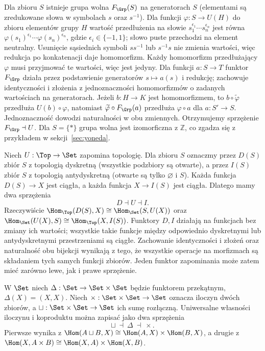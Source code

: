 \begin{przyklad}
Dla zbioru $S$ istnieje grupa wolna $F_{\Grp}(S)$ na generatorach $S$ (elementami są zredukowane słowa w symbolach $s$ oraz $s^{-1}$). Dla funkcji $\varphi:S\to U(H)$ do zbioru elementów grupy $H$ wartość przedłużenia na słowie $s_1^{\epsilon_1}\cdots s_n^{\epsilon_n}$ jest równa $\varphi(s_1)^{\epsilon_1}\cdots\varphi(s_n)^{\epsilon_n}$, gdzie $\epsilon_i\in\{-1,1\}$; słowo puste przechodzi na element neutralny. Usunięcie sąsiednich symboli $ss^{-1}$ lub $s^{-1}s$ nie zmienia wartości, więc redukcja po konkatenacji daje homomorfizm. Każdy homomorfizm przedłużający $\varphi$ musi przyjmować te wartości, więc jest jedyny. Dla funkcji $a:S\to T$ funktor $F_{\Grp}$ działa przez podstawienie generatorów $s\mapsto a(s)$ i redukcję; zachowuje identyczności i złożenia z jednoznaczności homomorfizmów o zadanych wartościach na generatorach. Jeżeli $b:H\to K$ jest homomorfizmem, to $b\circ\widetilde\varphi$ przedłuża $U(b)\circ\varphi$, natomiast $\widetilde\varphi\circ F_{\Grp}(a)$ przedłuża $\varphi\circ a$ dla $a:S'\to S$. Jednoznaczność dowodzi naturalności w obu zmiennych. Otrzymujemy sprzężenie $F_{\Grp}\dashv U$. Dla $S=\{*\}$ grupa wolna jest izomorficzna z $\mathbb Z$, co zgadza się z przykładem w sekcji~\ref{sec:yoneda}.
\end{przyklad}

\begin{przyklad}
Niech $U:\Top\to\Set$ zapomina topologię. Dla zbioru $S$ oznaczmy przez $D(S)$ zbiór $S$ z topologią dyskretną (wszystkie podzbiory są otwarte), a przez $I(S)$ zbiór $S$ z topologią antydyskretną (otwarte są tylko $\varnothing$ i $S$). Każda funkcja $D(S)\to X$ jest ciągła, a każda funkcja $X\to I(S)$ jest ciągła. Dlatego mamy dwa sprzężenia
\[
D\dashv U\dashv I.
\]
Rzeczywiście $\Hom_{\Top}(D(S),X)\cong\Hom_{\Set}(S,U(X))$ oraz $\Hom_{\Set}(U(X),S)\cong\Hom_{\Top}(X,I(S))$. Funktory $D,I$ działają na funkcjach bez zmiany ich wartości; wszystkie takie funkcje między odpowiednio dyskretnymi lub antydyskretnymi przestrzeniami są ciągłe. Zachowanie identyczności i złożeń oraz naturalność obu bijekcji wynikają z tego, że wszystkie operacje na morfizmach są składaniem tych samych funkcji zbiorów. Jeden funktor zapominania może zatem mieć zarówno lewe, jak i prawe sprzężenie.
\end{przyklad}

\begin{przyklad}\label{przyklad:diag-adj}
W $\Set$ niech $\Delta:\Set\to\Set\times\Set$ będzie funktorem przekątnym, $\Delta(X)=(X,X)$. Niech $\times:\Set\times\Set\to\Set$ oznacza iloczyn dwóch zbiorów, a $\sqcup:\Set\times\Set\to\Set$ ich sumę rozłączną. Uniwersalne własności iloczynu i koproduktu można zapisać jako dwa sprzężenia
\[
\sqcup\ \dashv\ \Delta\ \dashv\ \times.
\]
Pierwsze wynika z $\Hom(A\sqcup B,X)\cong\Hom(A,X)\times\Hom(B,X)$, a drugie z $\Hom(X,A\times B)\cong\Hom(X,A)\times\Hom(X,B)$.
\end{przyklad}


